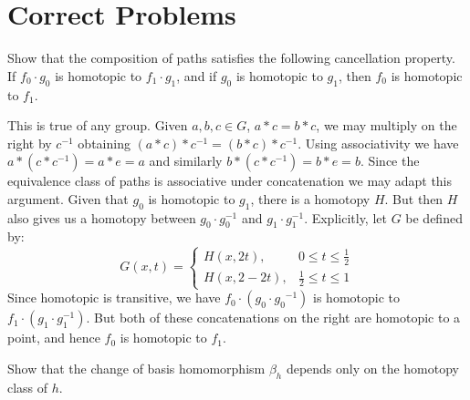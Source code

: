\documentclass{book}                                                           %
\begin{document}
    \section{Correct Problems}
        \begin{problem}
            Show that the composition of paths satisfies the following cancellation
            property. If $f_{0}\cdot{g}_{0}$ is homotopic to $f_{1}\cdot{g}_{1}$,
            and if $g_{0}$ is homotopic to $g_{1}$, then $f_{0}$ is homotopic to
            $f_{1}$.
        \end{problem}
        \begin{solution}
            This is true of any group. Given $a,b,c\in{G}$, $a*c=b*c$, we may
            multiply on the right by $c^{\minus{1}}$ obtaining
            $(a*c)*c^{\minus{1}}=(b*c)*c^{\minus{1}}$. Using associativity we have
            $a*(c*c^{\minus{1}})=a*e=a$ and similarly $b*(c*c^{\minus{1}})=b*e=b$.
            Since the equivalence class of paths is associative under concatenation
            we may adapt this argument. Given that $g_{0}$ is homotopic to $g_{1}$,
            there is a homotopy $H$. But then $H$  also gives us a homotopy between
            $g_{0}\cdot{g}_{0}^{\minus{1}}$ and $g_{1}\cdot{g}_{1}^{\minus{1}}$.
            Explicitly, let $G$ be defined by:
            \begin{equation}
                G(x,t)=
                \begin{cases}
                    H(x,2t),&0\leq{t}\leq\frac{1}{2}\\
                    H(x,2-2t),&\frac{1}{2}\leq{t}\leq{1}
                \end{cases}
            \end{equation}
            Since homotopic is transitive, we have
            $f_{0}\cdot(g_{0}\cdot{g_{0}}^{\minus{1}})$ is homotopic to
            $f_{1}\cdot(g_{1}\cdot{g}_{1}^{\minus{1}})$. But both of these
            concatenations on the right are homotopic to a point, and hence
            $f_{0}$ is homotopic to $f_{1}$.
        \end{solution}
        \begin{problem}
            Show that the change of basis homomorphism $\beta_{h}$ depends only on
            the homotopy class of $h$.
        \end{problem}
\end{document}
